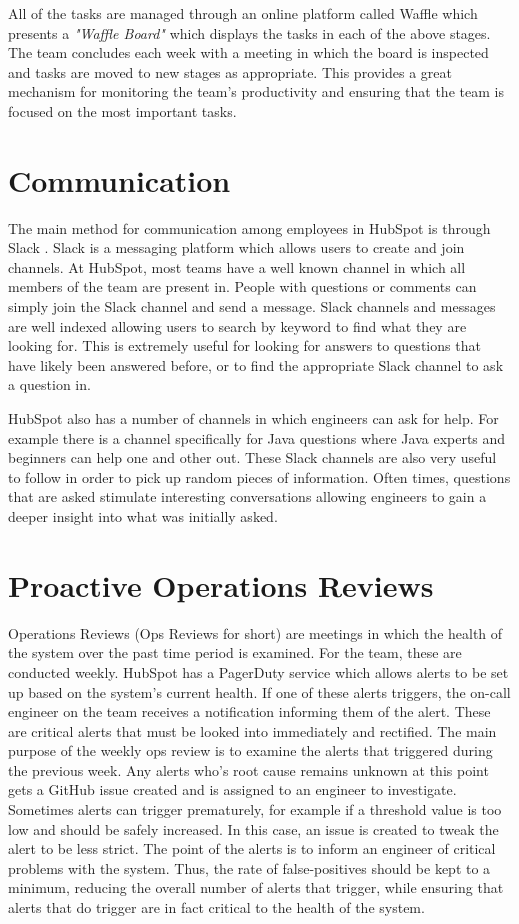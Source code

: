 All of the tasks are managed through an online platform called Waffle \cite{waffle} which presents a \textit{"Waffle Board"} which displays the tasks in each of the above stages. The team concludes each week with a meeting in which the board is inspected and tasks are moved to new stages as appropriate. This provides a great mechanism for monitoring the team's productivity and ensuring that the team is focused on the most important tasks. 

\section{Communication}
The main method for communication among employees in HubSpot is through Slack \cite{slack}. Slack is a messaging platform which allows users to create and join channels. At HubSpot, most teams have a well known channel in which all members of the team are present in. People with questions or comments can simply join the Slack channel and send a message. Slack channels and messages are well indexed allowing users to search by keyword to find what they are looking for. This is extremely useful for looking for answers to questions that have likely been answered before, or to find the appropriate Slack channel to ask a question in.

HubSpot also has a number of channels in which engineers can ask for help. For example there is a channel specifically for Java questions where Java experts and beginners can help one and other out. These Slack channels are also very useful to follow in order to pick up random pieces of information. Often times, questions that are asked stimulate interesting conversations allowing engineers to gain a deeper insight into what was initially asked.

\section{Proactive Operations Reviews}
Operations Reviews (Ops Reviews for short) are meetings in which the health of the system over the past time period is examined. For the \team{} team, these are conducted weekly. HubSpot has a PagerDuty service which allows alerts to be set up based on the system's current health. If one of these alerts triggers, the on-call engineer on the team receives a notification informing them of the alert. These are critical alerts that must be looked into immediately and rectified. The main purpose of the weekly ops review is to examine the alerts that triggered during the previous week. Any alerts who's root cause remains unknown at this point gets a GitHub issue created and is assigned to an engineer to investigate. Sometimes alerts can trigger prematurely, for example if a threshold value is too low and should be safely increased. In this case, an issue is created to tweak the alert to be less strict. The point of the alerts is to inform an engineer of critical problems with the system. Thus, the rate of false-positives should be kept to a minimum, reducing the overall number of alerts that trigger, while ensuring that alerts that do trigger are in fact critical to the health of the system.

